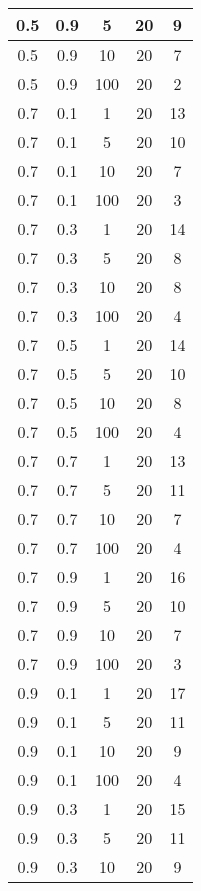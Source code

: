 \begin{appendices}
\begin{longtable}{|c|c|c|c|c|}
 0.5   & 0.9    & 5    & 20    & 9     \\ \hline
 0.5   & 0.9    & 10   & 20    & 7     \\ \hline
 0.5   & 0.9    & 100  & 20    & 2     \\ \hline
 0.7   & 0.1    & 1    & 20    & 13    \\ \hline
 0.7   & 0.1    & 5    & 20    & 10    \\ \hline
 0.7   & 0.1    & 10   & 20    & 7     \\ \hline
 0.7   & 0.1    & 100  & 20    & 3     \\ \hline
 0.7   & 0.3    & 1    & 20    & 14    \\ \hline
 0.7   & 0.3    & 5    & 20    & 8     \\ \hline
 0.7   & 0.3    & 10   & 20    & 8     \\ \hline
 0.7   & 0.3    & 100  & 20    & 4     \\ \hline
 0.7   & 0.5    & 1    & 20    & 14    \\ \hline
 0.7   & 0.5    & 5    & 20    & 10    \\ \hline
 0.7   & 0.5    & 10   & 20    & 8     \\ \hline
 0.7   & 0.5    & 100  & 20    & 4     \\ \hline
 0.7   & 0.7    & 1    & 20    & 13    \\ \hline
 0.7   & 0.7    & 5    & 20    & 11    \\ \hline
 0.7   & 0.7    & 10   & 20    & 7     \\ \hline
 0.7   & 0.7    & 100  & 20    & 4     \\ \hline
 0.7   & 0.9    & 1    & 20    & 16    \\ \hline
 0.7   & 0.9    & 5    & 20    & 10    \\ \hline
 0.7   & 0.9    & 10   & 20    & 7     \\ \hline
 0.7   & 0.9    & 100  & 20    & 3     \\ \hline
 0.9   & 0.1    & 1    & 20    & 17    \\ \hline
 0.9   & 0.1    & 5    & 20    & 11    \\ \hline
 0.9   & 0.1    & 10   & 20    & 9     \\ \hline
 0.9   & 0.1    & 100  & 20    & 4     \\ \hline
 0.9   & 0.3    & 1    & 20    & 15    \\ \hline
 0.9   & 0.3    & 5    & 20    & 11    \\ \hline
 0.9   & 0.3    & 10   & 20    & 9     \\ \hline

\end{longtable}
\end{appendices}
